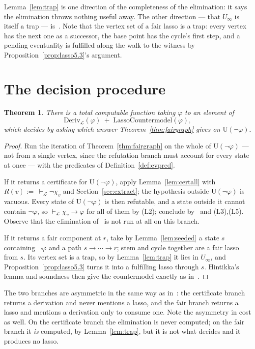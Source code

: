 \documentclass[11pt,a4paper]{article}
\newtheorem{theorem}{Theorem}[section]
\theoremstyle{definition}
\newcommand{\Ust}{\mathrm{U}}
\newcommand{\proves}{\vdash_{\mathcal{L}}}
\begin{document}
Lemma~\ref{lem:trap} is one direction of the completeness of the elimination:
it says the elimination throws nothing useful away.  The other direction ---
that $U_\infty$ is itself a trap --- is~\cite[Lem.~5.1]{m4}.  Note that the
vertex set of a fair lasso is a trap: every vertex has the next one as a
successor, the base point has the cycle's first step, and a pending eventuality
is fulfilled along the walk to the witness by
Proposition~\ref{prop:lasso5.3}'s argument.

\section{The decision procedure}\label{sec:decide}

\begin{theorem}\label{thm:sccmain}
There is a total computable function taking $\varphi$ to an element of
\[
  \mathrm{Deriv}_{\mathcal{L}}(\varphi)\;+\;\mathrm{LassoCountermodel}(\varphi),
\]
which decides by asking which answer Theorem~\ref{thm:fairgraph} gives on
$\Ust(\neg\varphi)$.
\end{theorem}

\begin{proof}
Run the iteration of Theorem~\ref{thm:fairgraph} on the whole of
$\Ust(\neg\varphi)$ --- not from a single vertex, since the refutation branch
must account for every state at once --- with the predicates of
Definition~\ref{def:evpred}.

If it returns a certificate for $\Ust(\neg\varphi)$, apply
Lemma~\ref{lem:certall} with $R(v):=\ \proves\neg\chi_v$ and
Section~\ref{sec:extract}; the hypothesis outside $\Ust(\neg\varphi)$ is
vacuous.  Every state of $\Ust(\neg\varphi)$ is then refutable, and a state
outside it cannot contain $\neg\varphi$, so $\proves\chi_v\to\varphi$ for all
of them by (L2); conclude by~\cite[Lem.~2.6]{m4} and (L3),(L5).  Observe that
the elimination of~\cite{m4} is not run at all on this branch.

If it returns a fair component at $r$, take by Lemma~\ref{lem:seeded} a state
$s$ containing $\neg\varphi$ and a path $s\to\cdots\to r$; stem and cycle
together are a fair lasso from $s$.  Its vertex set is a trap, so by
Lemma~\ref{lem:trap} it lies in $U_\infty$, and
Proposition~\ref{prop:lasso5.3} turns it into a fulfilling lasso through $s$.
Hintikka's lemma and soundness then give the countermodel exactly as
in~\cite[Thm.~6.1]{m4}.
\end{proof}

The two branches are asymmetric in the same way as in~\cite{m4}: the
certificate branch returns a derivation and never mentions a lasso, and the
fair branch returns a lasso and mentions a derivation only to consume one.
Note the asymmetry in cost as well.  On the certificate branch the elimination
is never computed; on the fair branch it \emph{is} computed, by
Lemma~\ref{lem:trap}, but it is not what decides and it produces no lasso.
\end{document}
